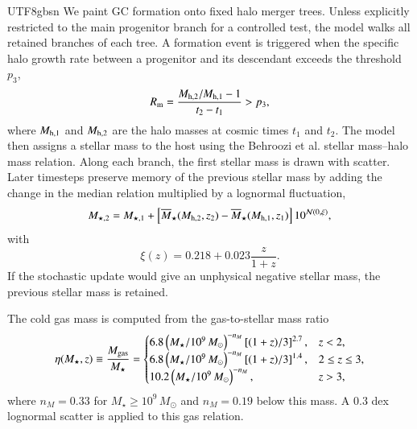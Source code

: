 \documentclass[trackchanges, twocolappendix, twocolumn]{aastex701}
\begin{document}
\begin{CJK*}{UTF8}{gbsn}
We paint GC formation onto fixed halo merger trees. Unless explicitly restricted to the main progenitor branch for a controlled test, the model walks all retained branches of each tree. A formation event is triggered when the specific halo growth rate between a progenitor and its descendant exceeds the threshold \(p_3\),
\begin{equation}
R_{\rm m} =
\frac{M_{{\rm h},2}/M_{{\rm h},1}-1}{t_2-t_1}
> p_3 ,
\label{eq:formation_trigger}
\end{equation}
where \(M_{{\rm h},1}\) and \(M_{{\rm h},2}\) are the halo masses at cosmic times \(t_1\) and \(t_2\). The model then assigns a stellar mass to the host using the Behroozi et al. stellar mass--halo mass relation. Along each branch, the first stellar mass is drawn with scatter. Later timesteps preserve memory of the previous stellar mass by adding the change in the median relation multiplied by a lognormal fluctuation,
\begin{equation}
M_{\star,2} =
M_{\star,1}+
\left[\overline{M}_{\star}(M_{{\rm h},2},z_2)
-\overline{M}_{\star}(M_{{\rm h},1},z_1)\right]
10^{\mathcal{N}(0,\xi)} ,
\end{equation}
with
\begin{equation}
\xi(z)=0.218+0.023\frac{z}{1+z}.
\end{equation}
If the stochastic update would give an unphysical negative stellar mass, the previous stellar mass is retained.

The cold gas mass is computed from the gas-to-stellar mass ratio
\begin{equation}
\eta(M_{\star},z) \equiv \frac{M_{\rm gas}}{M_{\star}} =
\begin{cases}
6.8\left(M_{\star}/10^9\,M_{\odot}\right)^{-n_M}
\left[(1+z)/3\right]^{2.7}, & z<2,\\
6.8\left(M_{\star}/10^9\,M_{\odot}\right)^{-n_M}
\left[(1+z)/3\right]^{1.4}, & 2\le z\le 3,\\
10.2\left(M_{\star}/10^9\,M_{\odot}\right)^{-n_M}, & z>3,
\end{cases}
\label{eq:gas_fraction}
\end{equation}
where \(n_M=0.33\) for \(M_{\star}\ge 10^9\,M_{\odot}\) and \(n_M=0.19\) below this mass. A 0.3 dex lognormal scatter is applied to this gas relation.


\end{CJK*}
\end{document}
